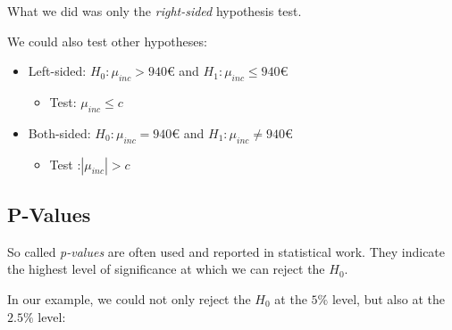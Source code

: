 \documentclass[]{article}
\providecommand{\tightlist}{%
  \setlength{\itemsep}{0pt}\setlength{\parskip}{0pt}}
\begin{document}
What we did was only the \emph{right-sided} hypothesis test.

We could also test other hypotheses:

\begin{itemize}
\tightlist
\item
  Left-sided: \(H_0: \mu_{inc} > 940€\) and \(H_1: \mu_{inc} \leq 940€\)

  \begin{itemize}
  \tightlist
  \item
    Test: \(\mu_{inc} \leq c\)
  \end{itemize}
\item
  Both-sided: \(H_0: \mu_{inc} = 940€\) and \(H_1: \mu_{inc} \neq 940€\)

  \begin{itemize}
  \tightlist
  \item
    Test :\(|\mu_{inc}| > c\)
  \end{itemize}
\end{itemize}

\subsection{P-Values}\label{p-values}

So called \emph{p-values} are often used and reported in statistical
work. They indicate the highest level of significance at which we can
reject the \(H_0\).

In our example, we could not only reject the \(H_0\) at the \(5\%\)
level, but also at the \(2.5\%\) level:
\end{document}
